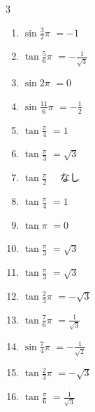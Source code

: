 \begin{multicols}{3}
\begin{enumerate}
  \item $\displaystyle \sin{\frac{3}{2}\pi}$
        $\displaystyle =-1$

  \item $\displaystyle \tan{\frac{5}{6}\pi}$
        $\displaystyle =-\frac{1}{\sqrt{3}}$

  \item $\displaystyle \sin{2\pi}$
        $\displaystyle =0$

\columnbreak %

  \item $\displaystyle \sin{\frac{11}{6}\pi}$
        $\displaystyle =-\frac{1}{2}$

  \item $\displaystyle \tan{\frac{\pi}{4}}$
        $\displaystyle =1$

  \item $\displaystyle \tan{\frac{\pi}{3}}$
        $\displaystyle =\sqrt{3}$

  \item $\displaystyle \tan{\frac{\pi}{2}}$
        $\displaystyle \quad なし$

  \item $\displaystyle \tan{\frac{\pi}{4}}$
        $\displaystyle =1$

  \item $\displaystyle \tan{\pi}$
        $\displaystyle =0$

  \item $\displaystyle \tan{\frac{\pi}{3}}$
        $\displaystyle =\sqrt{3}$

  \item $\displaystyle \tan{\frac{\pi}{3}}$
        $\displaystyle =\sqrt{3}$

  \item $\displaystyle \tan{\frac{2}{3}\pi}$
        $\displaystyle =-\sqrt{3}$

  \item $\displaystyle \tan{\frac{7}{6}\pi}$
        $\displaystyle =\frac{1}{\sqrt{3}}$

  \item $\displaystyle \sin{\frac{7}{4}\pi}$
        $\displaystyle =-\frac{1}{\sqrt{2}}$

  \item $\displaystyle \tan{\frac{2}{3}\pi}$
        $\displaystyle =-\sqrt{3}$

  \item $\displaystyle \tan{\frac{\pi}{6}}$
        $\displaystyle =\frac{1}{\sqrt{3}}$


\end{enumerate}
\end{multicols}
